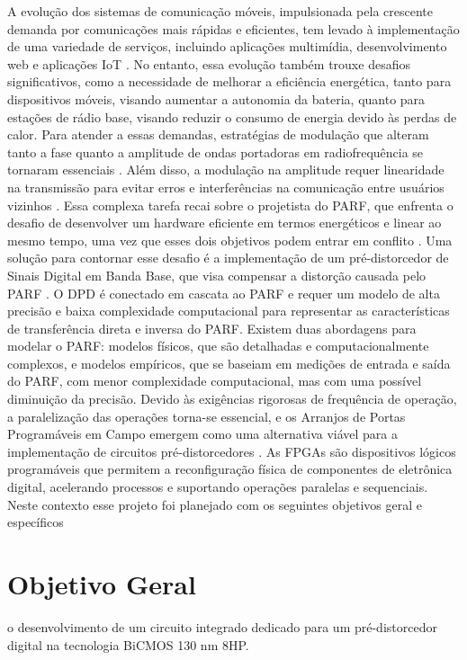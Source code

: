 A evolução dos sistemas de comunicação móveis, impulsionada pela crescente demanda por
comunicações mais rápidas e eficientes, tem levado à implementação de uma variedade de serviços,
incluindo aplicações multimídia, desenvolvimento web e aplicações IoT \cite{John2016}. No entanto, essa
evolução também trouxe desafios significativos, como a necessidade de melhorar a eficiência
energética, tanto para dispositivos móveis, visando aumentar a autonomia da bateria, quanto para
estações de rádio base, visando reduzir o consumo de energia devido às perdas de calor.
Para atender a essas demandas, estratégias de modulação que alteram tanto a fase quanto a
amplitude de ondas portadoras em radiofrequência se tornaram essenciais \cite{Kenington2000}. Além disso, a
modulação na amplitude requer linearidade na transmissão para evitar erros e interferências na
comunicação entre usuários vizinhos \cite{Cripps2006}. Essa complexa tarefa recai sobre o projetista do
PARF, que enfrenta o desafio de desenvolver um
hardware eficiente em termos energéticos e linear ao mesmo tempo, uma vez que esses dois objetivos
podem entrar em conflito \cite{Chavez2018}.
Uma solução para contornar esse desafio é a implementação de um pré-distorcedor de Sinais
Digital em Banda Base, que visa compensar a distorção causada pelo PARF \cite{Cripps2006}. O DPD é conectado em cascata ao PARF e requer um modelo de alta precisão e baixa complexidade computacional para representar as características de transferência direta e inversa do PARF. Existem duas abordagens para modelar o PARF: modelos físicos, que são detalhadas e computacionalmente complexos, e modelos empíricos, que se baseiam em medições de entrada e saída do PARF, com menor complexidade computacional, mas com uma possível diminuição da precisão.
Devido às exigências rigorosas de frequência de operação, a paralelização das operações
torna-se essencial, e os Arranjos de Portas Programáveis em Campo emergem como uma
alternativa viável para a implementação de circuitos pré-distorcedores \cite{Pedroni2010}. As FPGAs são dispositivos
lógicos programáveis que permitem a reconfiguração física de componentes de eletrônica digital,
acelerando processos e suportando operações paralelas e sequenciais. Neste contexto esse projeto foi planejado com os seguintes objetivos geral e específicos

\section{Objetivo Geral}
o desenvolvimento de um circuito integrado dedicado para um pré-distorcedor digital na tecnologia BiCMOS 130 nm 8HP.

